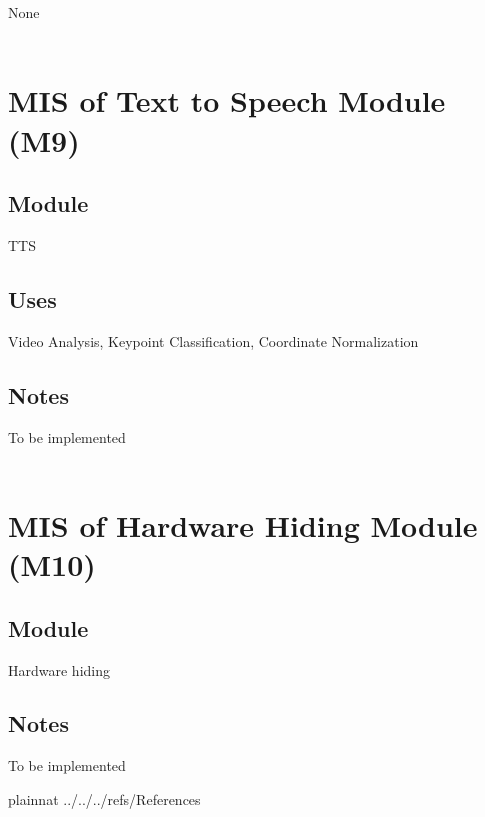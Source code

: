 \documentclass[12pt, titlepage]{article}
\begin{document}
None\\

~\newpage

\section{MIS of Text to Speech Module (M9)} \label{M9}

\subsection{Module}

TTS\\

\subsection{Uses}

Video Analysis, Keypoint Classification, Coordinate Normalization\\

\subsection{Notes}

To be implemented\\

~\newpage

\section{MIS of Hardware Hiding Module (M10)} \label{M10}

\subsection{Module}

Hardware hiding\\

\subsection{Notes}

To be implemented\\

\newpage

 {plainnat}
 {../../../refs/References}
\end{document}
